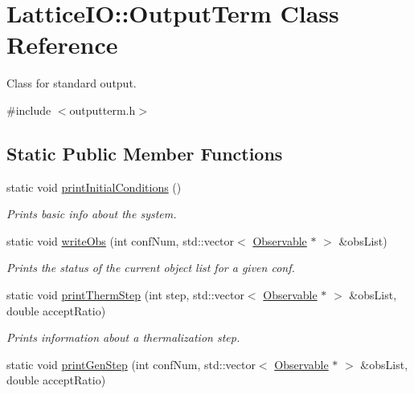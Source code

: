 \hypertarget{classLatticeIO_1_1OutputTerm}{}\section{Lattice\+IO\+:\+:Output\+Term Class Reference}
\label{classLatticeIO_1_1OutputTerm}


Class for standard output.  




{\ttfamily \#include $<$outputterm.\+h$>$}

\subsection*{Static Public Member Functions}
\begin{DoxyCompactItemize}
\item 
static void \hyperlink{classLatticeIO_1_1OutputTerm_ab92340daa2c801b5275d67838df1450b}{print\+Initial\+Conditions} ()\hypertarget{classLatticeIO_1_1OutputTerm_ab92340daa2c801b5275d67838df1450b}{}\label{classLatticeIO_1_1OutputTerm_ab92340daa2c801b5275d67838df1450b}

\begin{DoxyCompactList}\small\item\em Prints basic info about the system. \end{DoxyCompactList}\item 
static void \hyperlink{classLatticeIO_1_1OutputTerm_ab06002cace5e0450b9e618edfdb00d12}{write\+Obs} (int conf\+Num, std\+::vector$<$ \hyperlink{classObservable}{Observable} $\ast$ $>$ \&obs\+List)\hypertarget{classLatticeIO_1_1OutputTerm_ab06002cace5e0450b9e618edfdb00d12}{}\label{classLatticeIO_1_1OutputTerm_ab06002cace5e0450b9e618edfdb00d12}

\begin{DoxyCompactList}\small\item\em Prints the status of the current object list for a given conf. \end{DoxyCompactList}\item 
static void \hyperlink{classLatticeIO_1_1OutputTerm_aecda88f4a7724f1869fb40704d39ef58}{print\+Therm\+Step} (int step, std\+::vector$<$ \hyperlink{classObservable}{Observable} $\ast$ $>$ \&obs\+List, double accept\+Ratio)\hypertarget{classLatticeIO_1_1OutputTerm_aecda88f4a7724f1869fb40704d39ef58}{}\label{classLatticeIO_1_1OutputTerm_aecda88f4a7724f1869fb40704d39ef58}

\begin{DoxyCompactList}\small\item\em Prints information about a thermalization step. \end{DoxyCompactList}\item 
static void \hyperlink{classLatticeIO_1_1OutputTerm_a82d0d8fc4e4922df3c831c32a6802770}{print\+Gen\+Step} (int conf\+Num, std\+::vector$<$ \hyperlink{classObservable}{Observable} $\ast$ $>$ \&obs\+List, double accept\+Ratio)\hypertarget{classLatticeIO_1_1OutputTerm_a82d0d8fc4e4922df3c831c32a6802770}{}\label{classLatticeIO_1_1OutputTerm_a82d0d8fc4e4922df3c831c32a6802770}


\end{DoxyCompactItemize}
